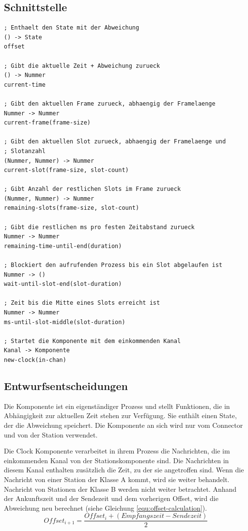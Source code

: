 \documentclass[draft=false
              ,paper=a4
              ,twoside=false
              ,fontsize=11pt
              ,headsepline
              ,BCOR10mm
              ,DIV11
              ]{scrbook}
\begin{document}
\subsection{Schnittstelle}
\begin{lstlisting}
; Enthaelt den State mit der Abweichung
() -> State
offset

; Gibt die aktuelle Zeit + Abweichung zurueck
() -> Nummer
current-time

; Gibt den aktuellen Frame zurueck, abhaengig der Framelaenge
Nummer -> Nummer
current-frame(frame-size)

; Gibt den aktuellen Slot zurueck, abhaengig der Framelaenge und
; Slotanzahl
(Nummer, Nummer) -> Nummer
current-slot(frame-size, slot-count)

; Gibt Anzahl der restlichen Slots im Frame zurueck
(Nummer, Nummer) -> Nummer
remaining-slots(frame-size, slot-count)

; Gibt die restlichen ms pro festen Zeitabstand zurueck
Nummer -> Nummer
remaining-time-until-end(duration)

; Blockiert den aufrufenden Prozess bis ein Slot abgelaufen ist
Nummer -> ()
wait-until-slot-end(slot-duration)

; Zeit bis die Mitte eines Slots erreicht ist
Nummer -> Nummer
ms-until-slot-middle(slot-duration)

; Startet die Komponente mit dem einkommenden Kanal
Kanal -> Komponente
new-clock(in-chan)
\end{lstlisting}

\subsection{Entwurfsentscheidungen}
Die Komponente ist ein eigenständiger Prozess und stellt Funktionen, die in Abhängigkeit zur aktuellen Zeit stehen zur Verfügung. Sie enthält einen State, der die Abweichung speichert. Die Komponente an sich wird nur vom Connector und von der Station verwendet.

Die Clock Komponente verarbeitet in ihrem Prozess die Nachrichten, die im einkommenden Kanal  von der Stationskomponente sind. Die Nachrichten in diesem Kanal enthalten zusätzlich die Zeit, zu der sie angetroffen sind.
Wenn die Nachricht von einer Station der Klasse A kommt, wird sie weiter behandelt. Nachricht von Stationen der Klasse B werden nicht weiter betrachtet.
Anhand der Ankunftszeit und der Sendezeit und dem vorherigen Offset, wird die Abweichung neu berechnet (siehe Gleichung \ref{equ:offset-calculation}).
\begin{equation}
Offset_{i+1} = \frac{Offset_i + (Empfangszeit - Sendezeit)}{2}
\label{equ:offset-calculation}
\end{equation}
\end{document}
